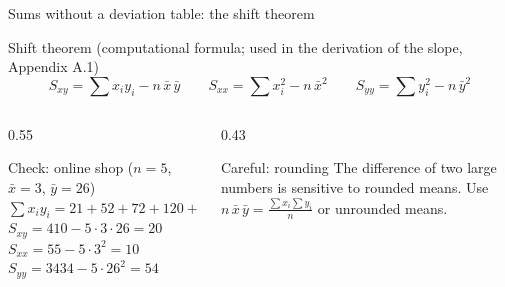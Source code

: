 \documentclass[aspectratio=169,11pt]{beamer}
\newcommand{\minlineskip}{%
  \setlength{\lineskiplimit}{2pt}\setlength{\lineskip}{2pt}%
  \setlength{\normallineskiplimit}{2pt}\setlength{\normallineskip}{2pt}}
\begin{document}
\begin{frame}{Sums without a deviation table: the shift theorem}
  \begin{block}{Shift theorem (computational formula; used in the derivation of the slope, Appendix A.1)}
    \[
      S_{xy} = \sum x_i y_i - n\,\bar{x}\,\bar{y}
      \qquad
      S_{xx} = \sum x_i^{2} - n\,\bar{x}^{2}
      \qquad
      S_{yy} = \sum y_i^{2} - n\,\bar{y}^{2}
    \]
    \vspace{-8pt}
  \end{block}

  \medskip
  \begin{columns}[T]
    \begin{column}{0.55\textwidth}
      \begin{exampleblock}{Check: online shop ($n = 5$, $\bar{x} = 3$, $\bar{y} = 26$)}
        \small
        $\sum x_i y_i = 21 + 52 + 72 + 120 + 145 = 410$\\
        $S_{xy} = 410 - 5 \cdot 3 \cdot 26 = 20$ \checkmark\\[2pt]
        $S_{xx} = 55 - 5 \cdot 3^{2} = 10$ \checkmark\\
        $S_{yy} = 3434 - 5 \cdot 26^{2} = 54$ \checkmark
      \end{exampleblock}
    \end{column}
    \begin{column}{0.43\textwidth}
      \minlineskip
      \begin{alertblock}{Careful: rounding}
        \small The difference of two large numbers is sensitive to rounded
        means. Use $n\,\bar{x}\,\bar{y} = \frac{\sum x_i \sum y_i}{n}$ or
        unrounded means.
      \end{alertblock}
    \end{column}
  \end{columns}
\end{frame}
\end{document}
